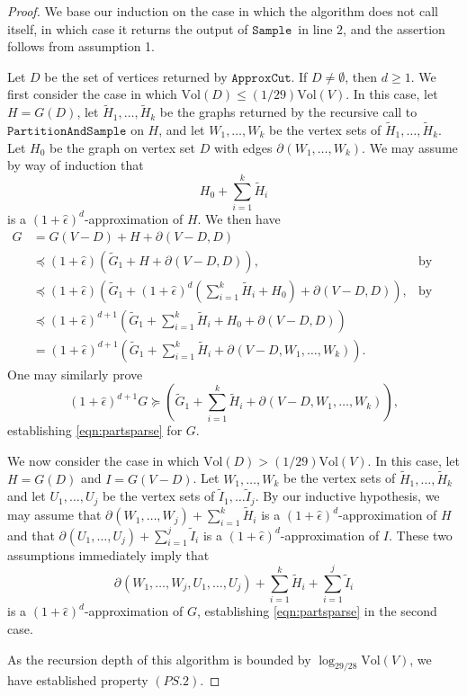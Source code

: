 \documentclass[11pt]{article}
\newcommand{\sample}{\ensuremath{\mathtt{Sample}}}
\newcommand{\approxcut}{\ensuremath{\mathtt{ApproxCut}}}
\newcommand{\partsample}{\ensuremath{\mathtt{PartitionAndSample}}}
\def\Htil{\widetilde{H}}
\def\Itil{\widetilde{I}}
\def\Gtil{\widetilde{G}}
\def\epshat{\hat{\epsilon}}
\def\bdry#1#2{\partial_{#1}\left(#2\right)}
\def\pleq{\preccurlyeq}
\def\pgeq{\succcurlyeq}
\def\pleq{\preccurlyeq}
\def\pgeq{\succcurlyeq}
\def\vol#1{\mathrm{Vol}\left(#1  \right)}
\begin{document}
\begin{proof}
We base our induction on the case in which the algorithm does not call itself,
  in which case it returns
the output of \sample \ in line $2$, and
  the assertion follows from
assumption 1.

Let $D$ be the set of vertices returned by \approxcut.
If $D \not = \emptyset$, then $d \geq 1$.
We first consider the case in which
  $\vol{D} \leq  (1/29) \vol{V}$.
In this case, let
  $H = G (D)$,
 let  $\Htil_{1}, \dotsc , \Htil_{k}$
  be the graphs returned by
  the recursive call to $\partsample$ on $H$,
  and let $W_{1}, \dotsc , W_{k}$ be the vertex sets of $\Htil_{1}, \dotsc , \Htil_{k}$.
Let $H_{0}$ be the graph on vertex set $D$ with edges $\bdry{}{W_{1}, \dotsc , W_{k}}$.
We may assume by way of induction that
\[
  H_{0} + \sum_{i=1}^{k} \Htil_{i}
\]
is a $(1+\epshat)^{d}$-approximation of $H$.
We then have
\begin{align*}
  G
& = G (V-D) + H + \bdry{}{V-D,D}\\
& \pleq (1+\epshat) \left(\Gtil_{1} + H +  \bdry{}{V-D,D} \right),
    & \text{by assumption 2,}\\
& \pleq (1+\epshat) \left(\Gtil_{1} +
  (1+\epshat)^{d}\left(\sum_{i=1}^{k}\Htil_{i} + H_{0} \right) + \bdry{}{V-D,D}   \right),
& \text{by induction,}
\\
& \pleq
  (1+\epshat)^{d+1} \left(\Gtil_{1} + \sum_{i=1}^{k}\Htil_{i} + H_{0} + \bdry{}{V-D,D} \right)\\
& =
  (1+\epshat)^{d+1} \left(\Gtil_{1} + \sum_{i=1}^{k}\Htil_{i} +
  \bdry{}{V-D, W_{1}, \dotsc , W_{k}}   \right).
\end{align*}
One may similarly prove
\[
(1+\epshat)^{d+1} G \pgeq \left(\Gtil_{1} + \sum_{i=1}^{k}\Htil_{i} +
  \bdry{}{V-D, W_{1}, \dotsc , W_{k}}   \right),
\]
establishing \eqref{eqn:partsparse} for $G$.

We now consider the case in which
  $\vol{D} > (1/29) \vol{V}$.
In this case, let
  $H = G (D)$ and $I = G (V-D)$.
Let $W_{1}, \dotsc , W_{k}$ be the vertex sets of $\Htil_{1}, \dotsc , \Htil_{k}$
  and let $U_{1}, \dotsc , U_{j}$
  be the vertex sets of $\Itil_{1}, \dotsc \Itil_{j}$.
By our inductive hypothesis, we may assume that
$\bdry{}{W_{1}, \dotsc , W_{j}} + \sum_{i=1}^{k} \Htil_{i}$
  is a $(1+\epshat)^{d}$-approximation of $H$ and that
$\bdry{}{U_{1}, \dotsc , U_{j}} + \sum_{i=1}^{j} \Itil_{i}$
  is a $(1+\epshat)^{d}$-approximation of $I$.
These two assumptions immediately imply that
\[
\bdry{}{W_{1}, \dotsc , W_{j}, U_{1}, \dotsc , U_{j}} + \sum_{i=1}^{k} \Htil_{i}
 + \sum_{i=1}^{j} \Itil_{i}
\]
is a $(1+\epshat)^{d}$-approximation of $G$,
  establishing \eqref{eqn:partsparse} in the second case.

As the recursion depth of this algorithm is bounded by
  $\log_{29/28} \vol{V}$, we have established property $(PS.2)$.
\end{proof}
\end{document}
